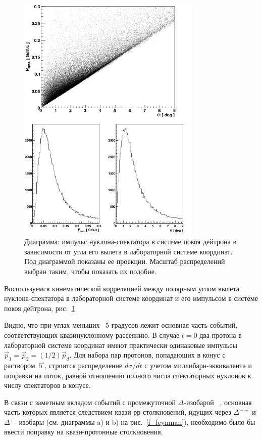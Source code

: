 \documentclass[a4paper,12pt]{article}
\begin{document}
\begin{figure}[!h]
  \centering
  \includegraphics[width=0.78\textwidth]{fig_theta_p.png}
  \caption {Диаграмма: импульс нуклона-спектатора в системе покоя
    дейтрона в зависимости от угла его вылета в лабораторной системе
    координат.  Под диаграммой показаны ее проекции. Масштаб
    распределений выбран таким, чтобы показать их подобие.}
  \label{f_tp}
\end{figure}

Воспользуемся кинематической корреляцией между полярным углом вылета
нуклона-спектатора в лабораторной системе координат и его импульсом в
системе покоя дейтрона, рис.~\ref{f_tp}

Видно, что при углах меньших ~5 градусов лежит основная часть событий,
соответствующих квазинуклонному рассеянию. В случае $t = 0$ два
протона в лабораторной системе координат имеют практически одинаковые
импульсы $\vec{p}_1 = \vec{p}_2 = (1/2)\vec{p}_d$. Для набора пар
протонов, попадающих в конус с раствором~$5^{\circ}$, строится
распределение $d\sigma/dt$ с учетом миллибарн-эквивалента и поправки
на поток, равной отношению полного числа спектаторных нуклонов к числу
спектаторов в конусе.

В связи с заметным вкладом событий с промежуточной $\Delta$-изобарой
~\cite{a14,a4}, основная часть которых является следствием квази-рр
столкновений, идущих через $\Delta^{++}$ и $\Delta^{+}$- изобары
(см. диаграммы a) и b) на рис.~\ref{f_feynman}), необходимо было бы
ввести поправку на квази-протонные столкновения. \\ \\
\end{document}
